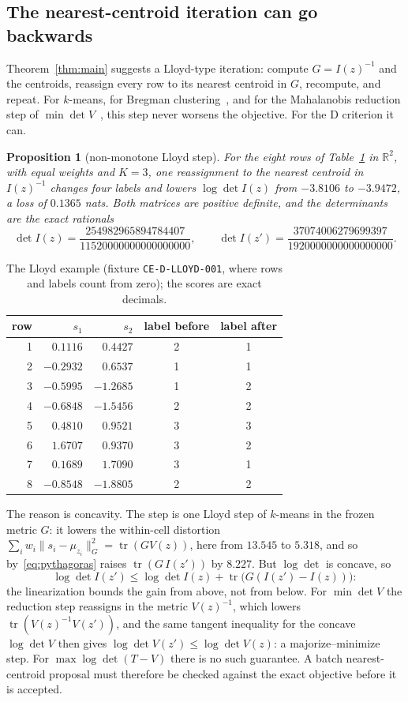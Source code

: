 \documentclass[11pt]{amsart}
\newtheorem{proposition}[theorem]{Proposition}
\theoremstyle{definition}
\theoremstyle{remark}
\newcommand{\R}{\mathbb{R}}
\newcommand{\tr}{\operatorname{tr}}
\newcommand{\Ib}{I(z)}
\begin{document}
\subsection*{The nearest-centroid iteration can go backwards}
Theorem~\ref{thm:main} suggests a Lloyd-type iteration: compute $G=\Ib^{-1}$ and the centroids,
reassign every row to its nearest centroid in $G$, recompute, and repeat. For $k$-means, for
Bregman clustering~\cite{lloyd1982,banerjee2005}, and for the Mahalanobis reduction step of
$\min\det V$~\cite{gallegos2005}, this step never worsens the objective. For the D criterion it
can.

\begin{proposition}[non-monotone Lloyd step]\label{prop:lloyd}
For the eight rows of Table~\ref{tab:lloyd} in $\R^2$, with equal weights and $K=3$, one
reassignment to the nearest centroid in $\Ib^{-1}$ changes four labels and lowers $\log\det\Ib$
from $-3.8106$ to $-3.9472$, a loss of $0.1365$ nats. Both matrices are positive definite, and
the determinants are the exact rationals
\[
\det\Ib=\frac{254982965894784407}{11520000000000000000},\qquad
\det I(z')=\frac{37074006279699397}{1920000000000000000}.
\]
\end{proposition}

\begin{table}[t]
\centering
\small
\begin{tabular}{@{}rrrcc@{}}
\toprule
row & $s_{1}$ & $s_{2}$ & label before & label after \\
\midrule
1 & $0.1116$ & $0.4427$ & 2 & 1 \\
2 & $-0.2932$ & $0.6537$ & 1 & 1 \\
3 & $-0.5995$ & $-1.2685$ & 1 & 2 \\
4 & $-0.6848$ & $-1.5456$ & 2 & 2 \\
5 & $0.4810$ & $0.9521$ & 3 & 3 \\
6 & $1.6707$ & $0.9370$ & 3 & 2 \\
7 & $0.1689$ & $1.7090$ & 3 & 1 \\
8 & $-0.8548$ & $-1.8805$ & 2 & 2 \\
\bottomrule
\end{tabular}
\caption{The Lloyd example (fixture \texttt{CE-D-LLOYD-001}, where rows and labels count from
zero); the scores are exact decimals.}
\label{tab:lloyd}
\end{table}

The reason is concavity. The step is one Lloyd step of $k$-means in the frozen metric $G$: it
lowers the within-cell distortion $\sum_iw_i\|s_i-\mu_{z_i}\|_G^2=\tr(GV(z))$, here from $13.545$
to $5.318$, and so by~\eqref{eq:pythagoras} raises $\tr(G\,I(z'))$ by $8.227$. But $\log\det$ is
concave, so
\[
\log\det I(z')\le\log\det\Ib+\tr\bigl(G(I(z')-\Ib)\bigr):
\]
the linearization bounds the gain from above, not from below. For $\min\det V$ the reduction
step reassigns in the metric $V(z)^{-1}$, which lowers $\tr(V(z)^{-1}V(z'))$, and the same tangent
inequality for the concave $\log\det V$ then gives $\log\det V(z')\le\log\det V(z)$: a
majorize--minimize step. For $\max\log\det(T-V)$ there is no such guarantee. A
batch nearest-centroid proposal must therefore be checked against the exact objective before it
is accepted.
\end{document}
